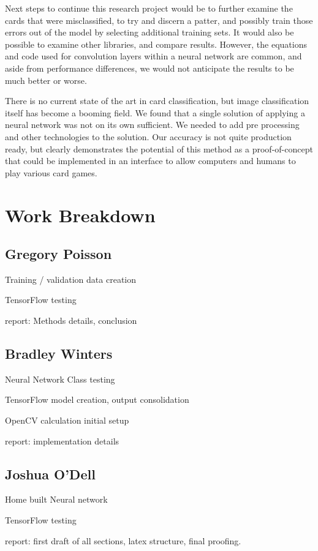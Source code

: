 \documentclass[letterpaper]{article}
\begin{document}
Next steps to continue this research project would be to further examine the cards that were misclassified, to try and discern a patter, and possibly train those errors out of the model by selecting additional training sets.  It would also be possible to examine other libraries, and compare results.  However, the equations and code used for convolution layers within a neural network are common, and aside from performance differences, we would not anticipate the results to be much better or worse.

There is no current state of the art in card classification, but image classification itself has become a booming field.  We found that a single solution of applying a neural network was not on its own sufficient.  We needed to add pre processing and other technologies to the solution.  Our accuracy is not quite production ready, but clearly demonstrates the potential of this method as a proof-of-concept that could be implemented in an interface to allow computers and humans to play various card games.


\nocite{*}



\section{Work Breakdown}

\subsection{Gregory Poisson}

Training / validation data creation

TensorFlow testing

report: Methods details, conclusion

\subsection{Bradley Winters}

Neural Network Class testing

TensorFlow model creation, output consolidation

OpenCV calculation initial setup

report: implementation details

\subsection{Joshua O'Dell}

Home built Neural network

TensorFlow testing

report: first draft of all sections, latex structure, final proofing.
\end{document}
